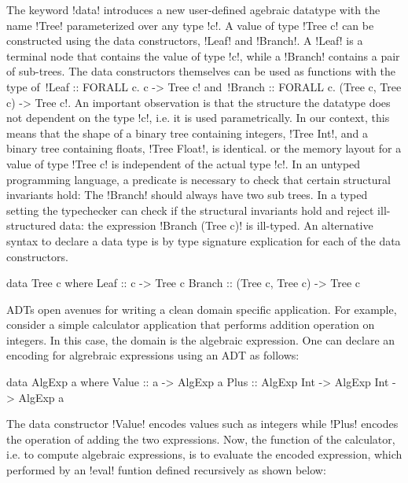 \documentclass[manuscript,screen,nonacm]{acmart}
\begin{document}
The keyword !data! introduces a new user-defined agebraic datatype with the name !Tree! parameterized over any type !c!. A value of type !Tree c! can be constructed using the data constructors, !Leaf! and !Branch!. A !Leaf! is a terminal node that contains the value of type !c!, while a !Branch! contains a pair of sub-trees. The data constructors themselves can be used as functions with the type of\, !Leaf :: FORALL c. c -> Tree c! and\, !Branch :: FORALL c. (Tree c, Tree c) -> Tree c!. An important observation is that the structure the datatype does not dependent on the type !c!, i.e. it is used parametrically. In our context, this means that the shape of a binary tree containing integers, !Tree Int!, and a binary tree containing floats, !Tree Float!, is identical. or the memory layout for a value of type !Tree c! is independent of the actual type !c!. In an untyped programming language, a predicate is necessary to check that certain structural invariants hold: The !Branch! should always have two sub trees. In a typed setting the typechecker can check if the structural invariants hold and reject ill-structured data: the expression !Branch (Tree c)! is ill-typed. An alternative syntax to declare a data type is by type signature explication for each of the data constructors.

\begin{CenteredBox}
\begin{code}
data Tree c where
    Leaf   :: c                -> Tree c
    Branch :: (Tree c, Tree c) -> Tree c
\end{code}
\end{CenteredBox}

ADTs open avenues for writing a clean domain specific application. For example, consider a simple calculator application that performs addition operation on integers. In this case, the domain is the algebraic expression. One can declare an encoding for algrebraic expressions using an ADT as follows:

\begin{CenteredBox}
\begin{code}
data AlgExp a where
    Value  ::  a                        -> AlgExp a
    Plus   ::  AlgExp Int -> AlgExp Int -> AlgExp a
\end{code}
\end{CenteredBox}

The data constructor !Value! encodes values such as integers while !Plus! encodes the operation of adding the two expressions. Now, the function of the calculator, i.e. to compute algebraic expressions, is to evaluate the encoded expression, which performed by an !eval! funtion defined recursively as shown below:
\end{document}
